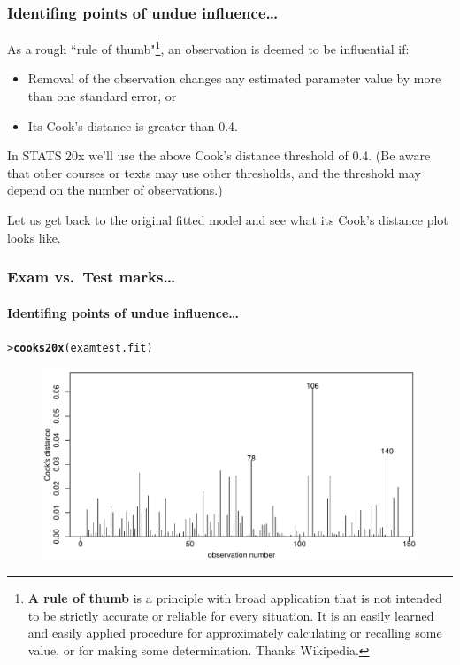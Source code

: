 \documentclass{beamer}\usepackage[]{graphicx}\usepackage[]{xcolor}
\makeatletter
\newcommand{\hlstd}[1]{\textcolor[rgb]{0.345,0.345,0.345}{#1}}%
\newcommand{\hlkwd}[1]{\textcolor[rgb]{0.737,0.353,0.396}{\textbf{#1}}}%
\newenvironment{kframe}{%
 \def\at@end@of@kframe{}%
 \ifinner\ifhmode%
  \def\at@end@of@kframe{\end{minipage}}%
  \begin{minipage}{\columnwidth}%
 \fi\fi%
 \def\FrameCommand##1{\hskip\@totalleftmargin \hskip-\fboxsep
 \colorbox{shadecolor}{##1}\hskip-\fboxsep
     \hskip-\linewidth \hskip-\@totalleftmargin \hskip\columnwidth}%
 \MakeFramed {\advance\hsize-\width
   \@totalleftmargin\z@ \linewidth\hsize
   \@setminipage}}%
 {\par\unskip\endMakeFramed%
 \at@end@of@kframe}
\newenvironment{knitrout}{}{} %
\makeatother
\begin{document}
\begin{frame}[fragile]
\frametitle{Identifing points of undue influence\ldots}

\medskip
As a rough ``rule of thumb"\footnote{\textbf{A rule of thumb} is a principle with broad application that is not intended to be strictly accurate or reliable for every situation. It is an easily learned and easily applied procedure for approximately calculating or recalling some value, or for making some determination. Thanks Wikipedia.},
an observation is deemed to be influential if:
\begin{itemize}
\item Removal of the observation changes any estimated parameter value by more than one standard error, or
\item Its Cook's distance is greater than 0.4.
\end{itemize}

In STATS 20x we'll use the above Cook's distance threshold of 0.4. (Be aware that other courses or texts may use other thresholds, and the threshold may depend on the number of observations.) 

Let us get back to the original fitted model and see what its Cook's distance plot looks like.

\end{frame}


\begin{frame}[fragile]
\frametitle{Exam vs.\ Test marks\ldots}
\framesubtitle{Identifing points of undue influence\ldots}

\begin{knitrout}\scriptsize
{}\color{fgcolor}\begin{kframe}
\begin{alltt}
\hlstd{> }\hlkwd{cooks20x}\hlstd{(examtest.fit)}
\end{alltt}
\end{kframe}
\end{knitrout}



\begin{figure}
  \centering
  \includegraphics[scale=0.5]{figure/RC-H02-025}
\end{figure}

\end{frame}
\end{document}
